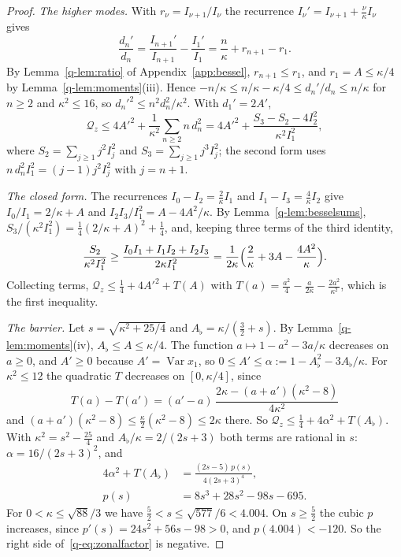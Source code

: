 \documentclass[aps,prd,twocolumn,superscriptaddress,nofootinbib,longbibliography,floatfix,amsmath,amssymb,10pt]{revtex4-2}
\theoremstyle{definition}
\theoremstyle{remark}
\newcommand{\Var}{\operatorname{Var}}
\begin{document}
\begin{proof}
\emph{The higher modes.} With $r_\nu=I_{\nu+1}/I_\nu$ the recurrence
$I_\nu'=I_{\nu+1}+\frac\nu\kappa I_\nu$ gives
\[
\frac{d_n'}{d_n}=\frac{I_{n+1}'}{I_{n+1}}-\frac{I_1'}{I_1}=\frac n\kappa+
r_{n+1}-r_1 .
\]
By Lemma~\ref{q-lem:ratio} of Appendix~\ref{app:bessel}, $r_{n+1}\le r_1$, and
$r_1=A\le\kappa/4$ by Lemma~\ref{q-lem:moments}(iii). Hence $-n/\kappa\le
n/\kappa-\kappa/4\le d_n'/d_n\le n/\kappa$ for $n\ge2$ and $\kappa^2\le16$, so
$d_n'^2\le n^2d_n^2/\kappa^2$. With $d_1'=2A'$,
\[
\mathcal Q_z\le4A'^2+\frac1{\kappa^2}\sum_{n\ge2}n\,d_n^2=4A'^2+\frac{S_3-
S_2-4I_2^2}{\kappa^2I_1^2},
\]
where $S_2=\sum_{j\ge1}j^2I_j^2$ and $S_3=\sum_{j\ge1}j^3I_j^2$; the
second form uses $n\,d_n^2I_1^2=(j-1)j^2I_j^2$ with $j=n+1$.

\emph{The closed form.} The recurrences $I_0-I_2=\frac2\kappa I_1$ and
$I_1-I_3=\frac4\kappa I_2$ give $I_0/I_1=2/\kappa+A$ and $I_2I_3/I_1^2=A-
4A^2/\kappa$. By Lemma~\ref{q-lem:besselsums},
$S_3/(\kappa^2I_1^2)=\frac14(2/\kappa+A)^2+\frac14$, and, keeping three
terms of the third identity,
\[
\frac{S_2}{\kappa^2I_1^2}\ge\frac{I_0I_1+I_1I_2+I_2I_3}{2\kappa I_1^2}=
\frac1{2\kappa}\Bigl(\frac2\kappa+3A-\frac{4A^2}\kappa\Bigr).
\]
Collecting terms, $\mathcal Q_z\le\frac14+4A'^2+T(A)$ with $T(a)=\frac{a^2}4-
\frac a{2\kappa}-\frac{2a^2}{\kappa^2}$, which is the first inequality.

\emph{The barrier.} Let $s=\sqrt{\kappa^2+25/4}$ and $A_\flat=\kappa/(\frac32
+s)$. By Lemma~\ref{q-lem:moments}(iv), $A_\flat\le A\le\kappa/4$. The function
$a\mapsto1-a^2-3a/\kappa$ decreases on $a\ge0$, and $A'\ge0$ because $A'=
\Var x_1$, so $0\le A'\le\alpha:=1-A_\flat^2-3A_\flat/\kappa$. For $\kappa^2\le
12$ the quadratic $T$ decreases on $[0,\kappa/4]$, since
\[
T(a)-T(a')=(a'-a)\,\frac{2\kappa-(a+a')(\kappa^2-8)}{4\kappa^2}
\]
and $(a+a')(\kappa^2-8)\le\frac\kappa2(\kappa^2-8)\le2\kappa$ there. So
$\mathcal Q_z\le\frac14+4\alpha^2+T(A_\flat)$. With $\kappa^2=s^2-\frac{25}4$
and $A_\flat/\kappa=2/(2s+3)$ both terms are rational in $s$:
$\alpha=16/(2s+3)^2$, and
\begin{equation}\label{q-eq:zonalfactor}
\begin{aligned}
4\alpha^2+T(A_\flat)&=\frac{(2s-5)\,p(s)}{4(2s+3)^4},\\
p(s)&=8s^3+28s^2-98s-695 .
\end{aligned}
\end{equation}
For $0<\kappa\le\sqrt{88}/3$ we have $\frac52<s\le\sqrt{577}/6<4.004$. On
$s\ge\frac52$ the cubic $p$ increases, since $p'(s)=24s^2+56s-98>0$, and
$p(4.004)<-120$. So the right side of~\eqref{q-eq:zonalfactor} is negative.
\end{proof}
\end{document}
